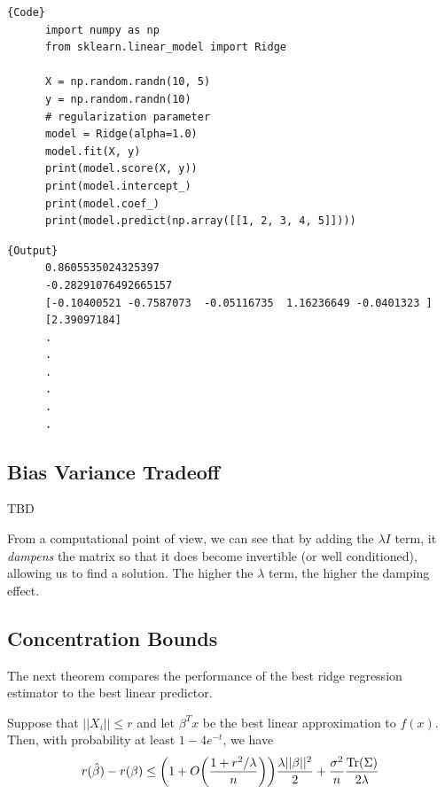   \begin{code}
    \noindent\begin{minipage}{.6\textwidth}
    \begin{lstlisting}[]{Code}
      import numpy as np 
      from sklearn.linear_model import Ridge  

      X = np.random.randn(10, 5) 
      y = np.random.randn(10)
      # regularization parameter
      model = Ridge(alpha=1.0)  
      model.fit(X, y) 
      print(model.score(X, y))  
      print(model.intercept_)
      print(model.coef_) 
      print(model.predict(np.array([[1, 2, 3, 4, 5]]))) 
    \end{lstlisting}
    \end{minipage}
    \hfill
    \begin{minipage}{.39\textwidth}
    \begin{lstlisting}[]{Output}
      0.8605535024325397
      -0.28291076492665157
      [-0.10400521 -0.7587073  -0.05116735  1.16236649 -0.0401323 ]
      [2.39097184]
      .
      .
      .
      .
      .
      .
    \end{lstlisting}
    \end{minipage}
  \end{code}

\subsection{Bias Variance Tradeoff}

  \begin{theorem}
    TBD 
  \end{theorem}

  From a computational point of view, we can see that by adding the $\lambda I$ term, it \textit{dampens} the matrix so that it does become invertible (or well conditioned), allowing us to find a solution. The higher the $\lambda$ term, the higher the damping effect. 

\subsection{Concentration Bounds}

  The next theorem compares the performance of the best ridge regression estimator to the best linear predictor. 

  \begin{theorem} 
    Suppose that $||X_i|| \leq r$ and let $\beta^T x$ be the best linear approximation to $f(x)$. Then, with probability at least $1 - 4 e^{-t}$, we have
    \begin{equation}
      r(\hat{\beta}) - r(\beta) \leq \bigg( 1 + O \bigg( \frac{1 + r^2 / \lambda}{n} \bigg) \bigg) \frac{\lambda ||\beta||^2}{2} + \frac{\sigma^2}{n} \frac{\Tr(\Sigma)}{2 \lambda}
    \end{equation}
  \end{theorem}

